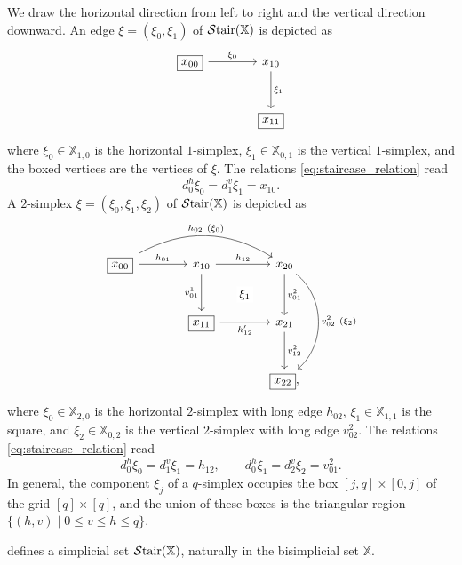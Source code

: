 \documentclass[10pt,reqno]{amsart}
\begin{document}
\begin{ex}
\label{ex:low_dimensional_staircases}
We draw the horizontal direction from left to right and the vertical
direction downward. An edge $\xi=(\xi_0,\xi_1)$ of
$\mathcal{S}\mathrm{tair}(\mathbb X)$ is depicted as
\[
\begin{tikzcd}[ampersand replacement=\&, sep=large]
\boxed{x_{00}}\arrow[r,"\xi_0"]
\&x_{10}\arrow[d,"\xi_1"]\\
\&\boxed{x_{11}}
\end{tikzcd}
\]
where $\xi_0\in\mathbb X_{1,0}$ is the horizontal $1$-simplex, $\xi_1\in\mathbb X_{0,1}$ is the vertical $1$-simplex, and the boxed vertices are the vertices of $\xi$. The relations \eqref{eq:staircase_relation} read
\[d_0^h\xi_0=d_1^v\xi_1=x_{10}.\]
A $2$-simplex
$\xi=(\xi_0,\xi_1,\xi_2)$ of $\mathcal{S}\mathrm{tair}(\mathbb X)$ is depicted as
\[
\begin{tikzcd}[ampersand replacement=\&, sep=large]
\boxed{x_{00}}\arrow[r,"h_{01}"]
 \arrow[rr,bend left=30,"h_{02}\ (\xi_0)"]
\&x_{10}\arrow[r,"h_{12}"]\arrow[d,"v^1_{01}"']
 \arrow[dr,phantom,"\xi_1" description]
\&x_{20}\arrow[d,"v^2_{01}"]
 \arrow[dd,bend left=50,"v^2_{02}\ (\xi_2)"]\\
\&\boxed{x_{11}}\arrow[r,"h'_{12}"']
\&x_{21}\arrow[d,"v^2_{12}"]\\
\&\&\boxed{x_{22}},
\end{tikzcd}
\]
where $\xi_0\in\mathbb X_{2,0}$ is the horizontal $2$-simplex with
long edge $h_{02}$, $\xi_1\in\mathbb X_{1,1}$ is the square, and
$\xi_2\in\mathbb X_{0,2}$ is the vertical $2$-simplex with long
edge $v^2_{02}$. The relations \eqref{eq:staircase_relation} read
\[
 d_0^h\xi_0=d_1^v\xi_1=h_{12},\qquad
 d_0^h\xi_1=d_2^v\xi_2=v^2_{01}.
\]
In general, the component $\xi_j$ of a $q$-simplex occupies the
box $[j,q]\times[0,j]$ of the grid $[q]\times[q]$, and the union of
these boxes is the triangular region
$\{(h,v)\mid 0\leq v\leq h\leq q\}$.
\end{ex}

\begin{proposition}
\label{prop:staircase_is_simplicial}
 defines a simplicial set
$\mathcal{S}\mathrm{tair}(\mathbb X)$, naturally in the bisimplicial set $\mathbb X$.
\end{proposition}
\end{document}
